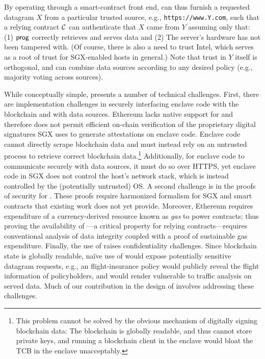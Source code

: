 By operating through a smart-contract front end, \tc can thus furnish a requested datagram $X$ from a particular trusted source, e.g., \texttt{https://www.Y.com}, such that a relying contract ${\cal C}$ can authenticate that $X$ came from $Y$ assuming only that: (1) ${\sf prog}$ correctly retrieves and serves data and (2) The \tc server's hardware has not been tampered with. (Of course, there is also a need to trust Intel, which serves as a root of trust for SGX-enabled hosts in general.) Note that trust in $Y$ itself is orthogonal, and \tc can combine data sources according to any desired policy (e.g., majority voting across sources).

While conceptually simple, \tc presents a number of technical challenges. First, there are implementation challenges in securely interfacing enclave code with the blockchain and with data sources. Ethereum lacks native support for and therefore does not permit efficient on-chain verification of the proprietary digital signatures SGX uses to generate attestations on enclave code. Enclave code cannot directly scrape blockchain data and must instead rely on an untrusted process to retrieve correct blockchain data.\footnote{This problem cannot be solved by the obvious mechanism of digitally signing blockchain data: The blockchain is globally readable, and thus cannot store private keys, and running a blockchain client in the enclave would bloat the TCB in the enclave unacceptably.} Additionally, for enclave code to communicate securely with data sources, it must do so over HTTPS, yet enclave code in SGX does not control the host's network stack, which is instead controlled by the (potentially untrusted) OS. A second challenge is in the proofs of security for \tc. These proofs require harmonized formalism for SGX and smart contracts that existing work does not yet provide. Moreover, Ethereum requires expenditure of a currency-derived resource known as \emph{gas} to power contracts; thus proving the availability of \tc---a critical property for relying contracts---requires conventional analysis of data integrity coupled with a proof of sustainable gas expenditure. Finally, the use of \tc raises confidentiality challenges. Since blockchain state is globally readable, na\"{i}ve use of \tc would expose potentially sensitive datagram requests, e.g., an flight-insurance policy would publicly reveal the flight information of policyholders, and would render \tc vulnerable to traffic analysis on served data. Much of our contribution in the design of \tc involves addressing these challenges. 

